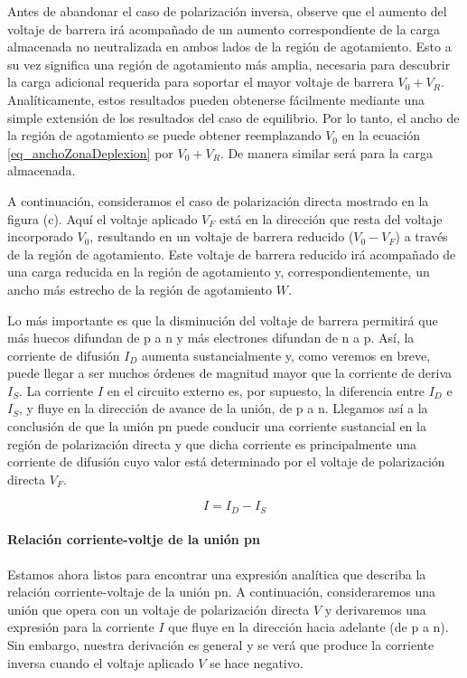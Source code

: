 Antes de abandonar el caso de polarización inversa, observe que el aumento del voltaje de barrera irá acompañado de un aumento correspondiente de la carga almacenada no neutralizada en ambos lados de la región de agotamiento. Esto a su vez significa una región de agotamiento más amplia, necesaria para descubrir la carga adicional requerida para soportar el mayor voltaje de barrera \(V_0 + V_R\). Analíticamente, estos resultados pueden obtenerse fácilmente mediante una simple extensión de los resultados del caso de equilibrio. Por lo tanto, el ancho de la región de agotamiento se puede obtener reemplazando \(V_0\) en la ecuación \ref{eq_anchoZonaDeplexion} por \(V_0 + V_R\). De manera similar será para la carga almacenada.

A continuación, consideramos el caso de polarización directa mostrado en la figura (c). Aquí el voltaje aplicado \(V_F\) está en la dirección que resta del voltaje incorporado \(V_0\), resultando en un voltaje de barrera reducido (\(V_0 - V_F\)) a través de la región de agotamiento. Este voltaje de barrera reducido irá acompañado de una carga reducida en la región de agotamiento y, correspondientemente, un ancho más estrecho de la región de agotamiento \(W\). 

Lo más importante es que la disminución del voltaje de barrera permitirá que más huecos difundan de p a n y más electrones difundan de n a p. Así, la corriente de difusión \(I_D\) aumenta sustancialmente y, como veremos en breve, puede llegar a ser muchos órdenes de magnitud mayor que la corriente de deriva \(I_S\). La corriente \(I\) en el circuito externo es, por supuesto, la diferencia entre \(I_D\) e \(I_S\), y fluye en la dirección de avance de la unión, de p a n. Llegamos así a la conclusión de que la unión pn puede conducir una corriente sustancial en la región de polarización directa y que dicha corriente es principalmente una corriente de difusión cuyo valor está determinado por el voltaje de polarización directa \(V_F\).

\begin{equation*}
I = I_D - I_S
\end{equation*}

\paragraph*{Relación corriente-voltje de la unión pn}

Estamos ahora listos para encontrar una expresión analítica que describa la relación corriente-voltaje de la unión pn. A continuación, consideraremos una unión que opera con un voltaje de polarización directa $V$ y derivaremos una expresión para la corriente $I$ que fluye en la dirección hacia adelante (de p a n). Sin embargo, nuestra derivación es general y se verá que produce la corriente inversa cuando el voltaje aplicado $V$ se hace negativo.

